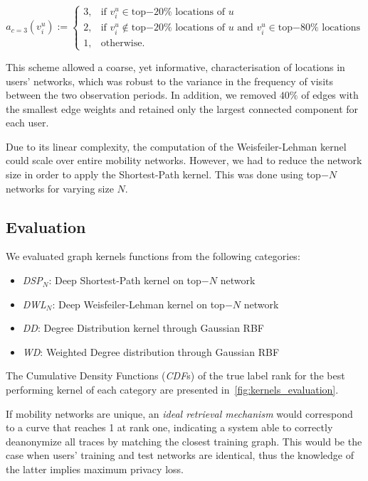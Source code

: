 \begin{equation*}
	a_{c=3}\left(v_i^u\right):=
	\begin{cases}
		 3, &  \mbox{if } v_i^u \in \mbox{top$-20\%$ locations of } u  \\
		 2, &  \mbox{if } v_i^u  \notin \mbox{top$-20\%$ locations of }  u   \mbox{ and }  v_i^u \in \mbox{top$-80\%$ locations}\\
		 1, &  \mbox{otherwise}.
	\end{cases}
\end{equation*}

This scheme allowed a coarse, yet informative, characterisation of locations in users' networks, which was robust to the variance in the frequency of visits between the two observation periods. In addition, we removed $40\%$ of edges with the smallest edge weights and retained only the largest connected component for each user.


Due to its linear complexity, the computation of the Weisfeiler-Lehman kernel could scale over entire mobility networks.
However, we had to reduce the network size in order to apply the Shortest-Path kernel.
This was done using top$-N$ networks for varying size $N$.



\subsection{Evaluation}

We evaluated graph kernels functions from the following categories:
\begin{itemize}
	\item \emph{DSP}$_{N}$: Deep Shortest-Path kernel on top$-N$ network
	\item \emph{DWL}$_{N}$: Deep Weisfeiler-Lehman kernel on top$-N$ network
	\item \emph{DD}: Degree Distribution kernel through Gaussian RBF
	\item \emph{WD}: Weighted Degree distribution through Gaussian RBF
\end{itemize}
The  Cumulative Density Functions (\emph{CDF}s) of the  true label rank for the best performing kernel of each category are presented in~\cref{fig:kernels_evaluation}.

If mobility networks are unique, an \emph{ideal retrieval mechanism} would correspond to a curve that reaches 1 at rank one, indicating a system able to correctly deanonymize all traces by matching the closest training graph.
This would be the case when users' training and test networks are identical, thus the knowledge of the latter implies maximum privacy loss.

